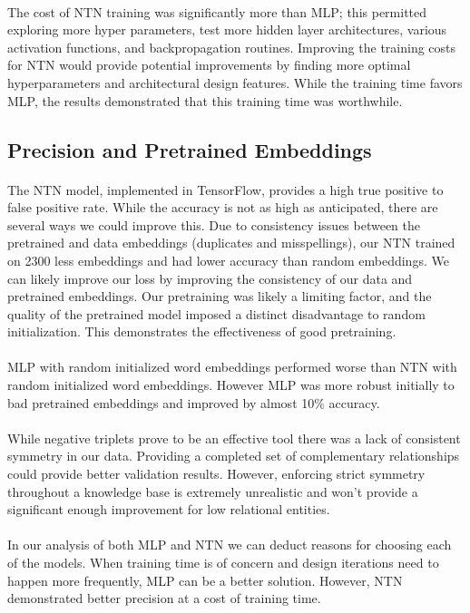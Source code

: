 \documentclass[11.5pt]{article}
\begin{document}
\paragraph{}The cost of NTN training was significantly more than MLP; this permitted exploring more hyper parameters, test more hidden layer architectures, various activation functions, and backpropagation routines. Improving the training costs for NTN would provide potential improvements by finding more optimal hyperparameters and architectural design features. While the training time favors MLP, the results demonstrated that this training time was worthwhile.

\subsection{Precision and Pretrained Embeddings}
\paragraph{} The NTN model, implemented in  TensorFlow, provides a high true positive to false positive rate. While the accuracy is not as high as anticipated, there are several ways we could improve this. Due to consistency issues between the pretrained and data embeddings (duplicates and misspellings), our NTN trained on 2300 less embeddings and had lower accuracy than random embeddings. We can likely improve our loss by improving the consistency of our data and pretrained embeddings. Our pretraining was likely a limiting factor, and the quality of the pretrained model imposed a distinct disadvantage to random initialization. This demonstrates the effectiveness of good pretraining.

\paragraph{} MLP with random initialized word embeddings performed worse than NTN with random initialized word embeddings. However MLP was more robust initially to bad pretrained embeddings and improved by almost 10\% accuracy. 

\paragraph{} While negative triplets prove to be an effective tool there was a lack of consistent symmetry in our data. Providing a completed set of complementary relationships could provide better validation results. However, enforcing strict symmetry throughout a knowledge base is extremely unrealistic and won't provide a significant enough improvement for low relational entities.

\paragraph{} In our analysis of both MLP and NTN we can deduct reasons for choosing each of the models. When training time is of concern and design iterations need to happen more frequently, MLP can be a better solution. However, NTN demonstrated better precision at a cost of training time.


{}
\end{document}
